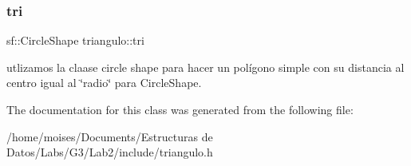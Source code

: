 \subsubsection{\texorpdfstring{tri}{tri}}
{\footnotesize\ttfamily sf\+::\+Circle\+Shape triangulo\+::tri}

utlizamos la claase circle shape para hacer un polígono simple con su distancia al centro igual al \char`\"{}radio\char`\"{} para Circle\+Shape. 

The documentation for this class was generated from the following file\+:\begin{DoxyCompactItemize}
\item 
/home/moises/\+Documents/\+Estructuras de Datos/\+Labs/\+G3/\+Lab2/include/triangulo.\+h\end{DoxyCompactItemize}
